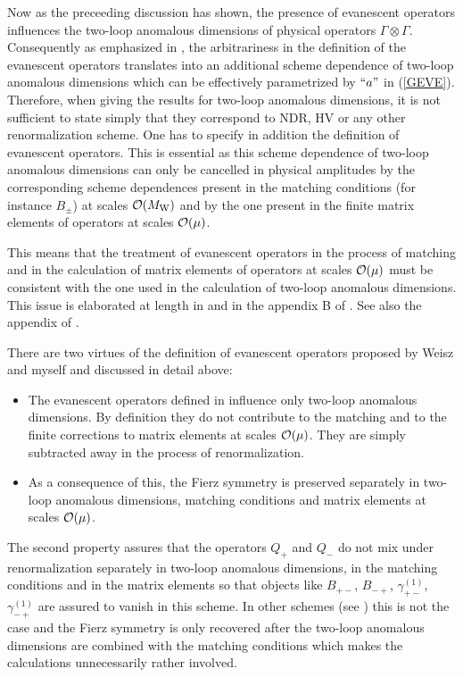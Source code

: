 \documentclass[12pt,rotate]{article}
\newcommand{\mw}{M_{\rm W}}
\newcommand{\bi}{\begin{itemize}}
\newcommand{\ei}{\end{itemize}}
\newcommand{\ord}{{\cal O}}
\begin{document}
\begin{itemize}
\begin{itemize}
Now as the preceeding discussion has shown, the presence of evanescent
operators influences the two-loop anomalous dimensions of physical
operators $\Gamma\otimes\Gamma$. Consequently as emphasized in
\cite{HNE}, the arbitrariness in the definition of the evanescent 
operators translates into an additional scheme dependence of two-loop
anomalous dimensions which can be effectively parametrized by  
$``a"$ in (\ref{GEVE}). Therefore, when giving the results for two-loop
anomalous dimensions, it is not sufficient to state simply that
they correspond to NDR, HV or any other renormalization scheme.
One has to specify in addition the definition of evanescent operators.
This is essential as this scheme dependence of two-loop anomalous
dimensions can only be cancelled in physical amplitudes by the 
corresponding scheme dependences present in the matching conditions
(for instance $B_\pm$) at scales $\ord(\mw)$ and by the one present
in the finite matrix elements of operators at scales $\ord(\mu)$.

This means that the treatment of evanescent operators in the
process of matching and in the calculation of
matrix elements of operators at scales $\ord(\mu)$ must be
consistent with the one used in the calculation of two-loop
anomalous dimensions. This issue is elaborated at length in
\cite{HNE,SH94,UN95} and in the appendix B of \cite{BLMM}.
See also the appendix of \cite{Potte}.

There are two virtues of the definition of evanescent operators
proposed by Weisz and myself and discussed in detail above:

\bi
\item
The evanescent operators defined in \cite{WEISZ} influence only
two-loop anomalous dimensions. By definition they do not contribute
to the matching and to the finite corrections to matrix elements
at scales $\ord(\mu)$. They are simply subtracted away in the process
of renormalization.
\item
As a consequence of this, the Fierz symmetry is preserved separately
in two-loop anomalous dimensions, matching conditions and
matrix elements at scales $\ord(\mu)$.
\ei
The second property assures that the operators $Q_+$ and $Q_-$
do not mix under renormalization separately in two-loop anomalous
dimensions, in the matching conditions and in the matrix elements
so that objects like $B_{+-}$, $B_{-+}$, $\gamma^{(1)}_{+-}$,
$\gamma^{(1)}_{-+}$ are assured to vanish in this scheme.
In other schemes (see \cite{DuGr}) this is not the case and
the Fierz symmetry is only recovered after the two-loop anomalous
dimensions are combined with the matching conditions which 
makes the calculations unnecessarily rather involved.


\end{itemize}
\end{itemize}
\end{document}
